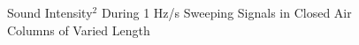 \begin{figure}
	\hspace{40pt}
	\caption{Sound Intensity$^2$ During 1 Hz/s Sweeping Signals in Closed Air Columns of Varied Length\label{fig:test}}
\end{figure}
